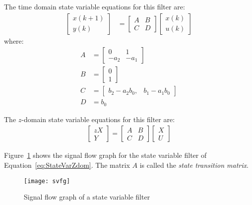 \documentclass[a4paper,twoside,10pt,english]{report}
\begin{document}
The time domain state variable equations for this filter are:
\begin{align} \label{eq:StateVarTime}
\left[\begin{array}{c}
x\left(k+1\right)\\
y\left(k\right)
\end{array}\right] &= \left[\begin{array}{cc}
A & B\\
C & D
\end{array}\right]\left[\begin{array}{c}
x\left(k\right)\\
u\left(k\right)
\end{array}\right]
\end{align}
where:
\begin{align*}
A &= \left[\begin{array}{cc}
0 & 1\\
-a_{2} & -a_{1}
\end{array}\right]\\
B &= \left[\begin{array}{c}
0\\
1
\end{array}\right] \\
C &= \left[\begin{array}{cc}
b_{2}-a_{2}b_{0}, & b_{1}-a_{1}b_{0}\end{array}\right]\\
D &= b_{0}
\end{align*} 

The $z$-domain state variable equations for this filter are:
\begin{align} \label{eq:StateVarZdom}
\left[\begin{array}{c}
zX\\
Y
\end{array}\right] 
= 
 \left[\begin{array}{cc}
A & B\\
C & D
\end{array}\right] 
\left[\begin{array}{c}
X\\
U
\end{array}\right]
\end{align}

Figure~\ref{fig:SVFG-PSFG} shows the signal flow graph for the state variable
filter of Equation~\ref{eq:StateVarZdom}. The matrix $A$ is called the
\emph{state transition matrix}.
\begin{figure}[!htbp]
\begin{center}
\texttt{[image: svfg]}
\caption{Signal flow graph of a state variable filter}
\label{fig:SVFG-PSFG}
\end{center}
\end{figure}
\end{document}
